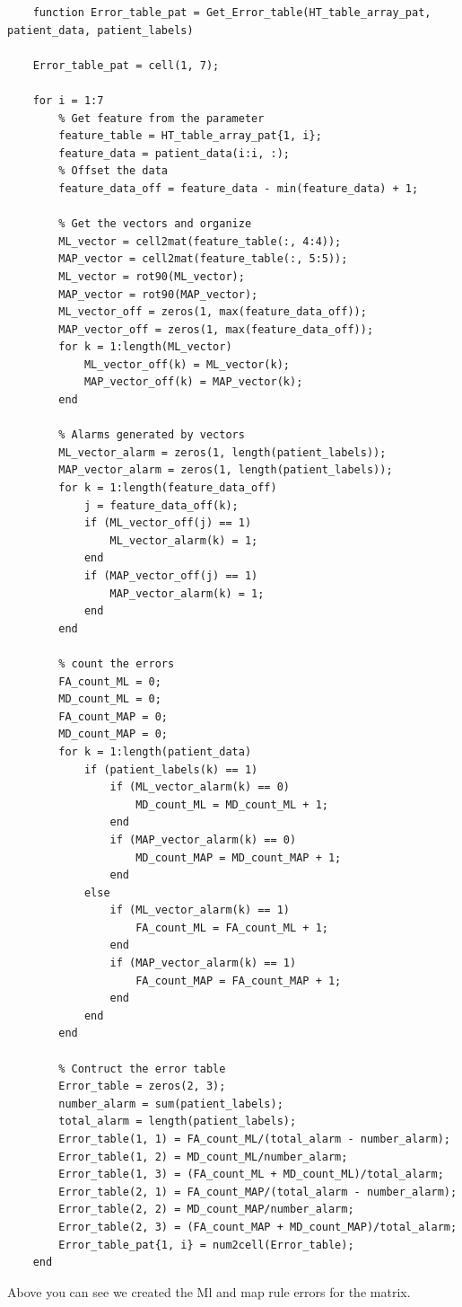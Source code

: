 \documentclass{article}
\begin{document}
  \begin{lstlisting}
    function Error_table_pat = Get_Error_table(HT_table_array_pat, patient_data, patient_labels)

    Error_table_pat = cell(1, 7);

    for i = 1:7
        % Get feature from the parameter
    	feature_table = HT_table_array_pat{1, i};
        feature_data = patient_data(i:i, :);
        % Offset the data
    	feature_data_off = feature_data - min(feature_data) + 1;

        % Get the vectors and organize
    	ML_vector = cell2mat(feature_table(:, 4:4));
    	MAP_vector = cell2mat(feature_table(:, 5:5));
    	ML_vector = rot90(ML_vector);
    	MAP_vector = rot90(MAP_vector);
        ML_vector_off = zeros(1, max(feature_data_off));
    	MAP_vector_off = zeros(1, max(feature_data_off));
    	for k = 1:length(ML_vector)
    		ML_vector_off(k) = ML_vector(k);
    		MAP_vector_off(k) = MAP_vector(k);
        end

        % Alarms generated by vectors
        ML_vector_alarm = zeros(1, length(patient_labels));
    	MAP_vector_alarm = zeros(1, length(patient_labels));
    	for k = 1:length(feature_data_off)
    		j = feature_data_off(k);
    		if (ML_vector_off(j) == 1)
    			ML_vector_alarm(k) = 1;
    		end
    		if (MAP_vector_off(j) == 1)
    			MAP_vector_alarm(k) = 1;
    		end
        end

        % count the errors
    	FA_count_ML = 0;
    	MD_count_ML = 0;
    	FA_count_MAP = 0;
    	MD_count_MAP = 0;
    	for k = 1:length(patient_data)
    		if (patient_labels(k) == 1)
    			if (ML_vector_alarm(k) == 0)
    				MD_count_ML = MD_count_ML + 1;
    			end
    			if (MAP_vector_alarm(k) == 0)
    				MD_count_MAP = MD_count_MAP + 1;
    			end
    		else
    			if (ML_vector_alarm(k) == 1)
    				FA_count_ML = FA_count_ML + 1;
    			end
    			if (MAP_vector_alarm(k) == 1)
    				FA_count_MAP = FA_count_MAP + 1;
    			end
    		end
        end

        % Contruct the error table
        Error_table = zeros(2, 3);
    	number_alarm = sum(patient_labels);
    	total_alarm = length(patient_labels);
    	Error_table(1, 1) = FA_count_ML/(total_alarm - number_alarm);
    	Error_table(1, 2) = MD_count_ML/number_alarm;
    	Error_table(1, 3) = (FA_count_ML + MD_count_ML)/total_alarm;
    	Error_table(2, 1) = FA_count_MAP/(total_alarm - number_alarm);
    	Error_table(2, 2) = MD_count_MAP/number_alarm;
    	Error_table(2, 3) = (FA_count_MAP + MD_count_MAP)/total_alarm;
    	Error_table_pat{1, i} = num2cell(Error_table);
    end
    \end{lstlisting}
    Above you can see we created the Ml and map rule errors for the matrix.
\end{document}
